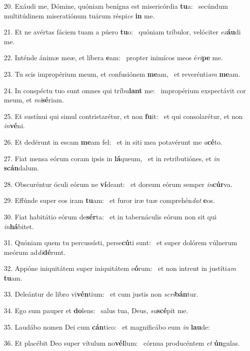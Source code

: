 20. Exáudi me, Dómine, quóniam benígna est misericórdia \textbf{tu}a: \ast\  secúndum multitúdinem miseratiónum tuárum réspi\textit{ce} \textbf{in} me.\

21. Et ne avértas fáciem tuam a púero \textbf{tu}o: \ast\  quóniam tríbulor, velóciter \textit{ex}\textbf{áu}di me.\

22. Inténde ánimæ meæ, et líbera \textbf{e}am: \ast\  propter inimícos meos é\textit{ri}\textbf{pe} me.\

23. Tu scis impropérium meum, et confusiónem \textbf{me}am, \ast\  et reverénti\textit{am} \textbf{me}am.\

24. In conspéctu tuo sunt omnes qui tríbu\textbf{lant} me: \ast\  impropérium exspectávit cor meum, et \textit{mi}\textbf{sé}riam.\

25. Et sustínui qui simul contristarétur, et non \textbf{fu}it: \ast\  et qui consolarétur, et non \textit{in}\textbf{vé}ni.\

26. Et dedérunt in escam \textbf{me}am fel: \ast\  et in siti mea potavérunt me \textit{a}\textbf{cé}to.\

27. Fiat mensa eórum coram ipsis in \textbf{lá}queum, \ast\  et in retributiónes, et \textit{in} \textbf{scán}dalum.\

28. Obscuréntur óculi eórum ne \textbf{ví}deant: \ast\  et dorsum eórum semper \textit{in}\textbf{cúr}va.\

29. Effúnde super eos iram \textbf{tu}am: \ast\  et furor iræ tuæ comprehén\textit{dat} \textbf{e}os.\

30. Fiat habitátio eórum de\textbf{sér}ta: \ast\  et in tabernáculis eórum non sit qui \textit{in}\textbf{há}bitet.\

31. Quóniam quem tu percussísti, perse\textbf{cú}ti sunt: \ast\  et super dolórem vúlnerum meórum ad\textit{di}\textbf{dé}runt.\

32. Appóne iniquitátem super iniquitátem e\textbf{ó}rum: \ast\  et non intrent in justíti\textit{am} \textbf{tu}am.\

33. Deleántur de libro vi\textbf{vén}tium: \ast\  et cum justis non \textit{scri}\textbf{bán}tur.\

34. Ego sum pauper et \textbf{do}lens: \ast\  salus tua, Deus, \textit{su}\textbf{scé}pit me.\

35. Laudábo nomen Dei cum \textbf{cán}tico: \ast\  et magnificábo eum \textit{in} \textbf{lau}de:\

36. Et placébit Deo super vítulum no\textbf{vél}lum: \ast\  córnua producéntem \textit{et} \textbf{ún}gulas.\

